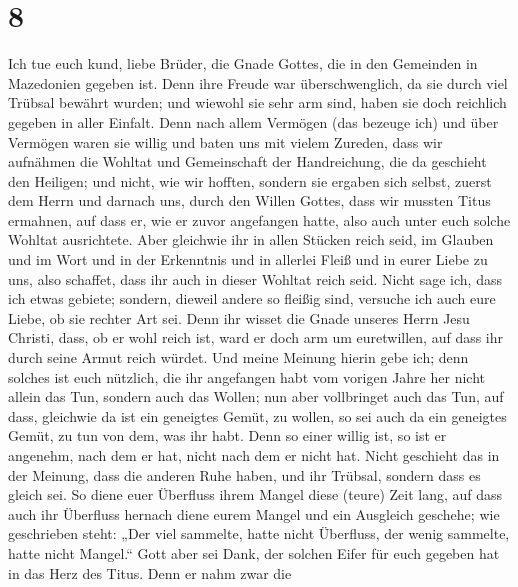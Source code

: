 \hypertarget{section-7}{%
\section{8}\label{section-7}}

 Ich tue euch kund, liebe Brüder, die Gnade Gottes, die in
den Gemeinden in Mazedonien gegeben ist.  Denn ihre Freude
war überschwenglich, da sie durch viel Trübsal bewährt wurden; und
wiewohl sie sehr arm sind, haben sie doch reichlich gegeben in aller
Einfalt.  Denn nach allem Vermögen (das bezeuge ich) und
über Vermögen waren sie willig  und baten uns mit vielem
Zureden, dass wir aufnähmen die Wohltat und Gemeinschaft der
Handreichung, die da geschieht den Heiligen;  und nicht,
wie wir hofften, sondern sie ergaben sich selbst, zuerst dem Herrn und
darnach uns, durch den Willen Gottes,  dass wir mussten
Titus ermahnen, auf dass er, wie er zuvor angefangen hatte, also auch
unter euch solche Wohltat ausrichtete.  Aber gleichwie ihr
in allen Stücken reich seid, im Glauben und im Wort und in der
Erkenntnis und in allerlei Fleiß und in eurer Liebe zu uns, also
schaffet, dass ihr auch in dieser Wohltat reich seid. 
Nicht sage ich, dass ich etwas gebiete; sondern, dieweil andere so
fleißig sind, versuche ich auch eure Liebe, ob sie rechter Art sei.
 Denn ihr wisset die Gnade unseres Herrn Jesu Christi,
dass, ob er wohl reich ist, ward er doch arm um euretwillen, auf dass
ihr durch seine Armut reich würdet.  Und meine Meinung
hierin gebe ich; denn solches ist euch nützlich, die ihr angefangen habt
vom vorigen Jahre her nicht allein das Tun, sondern auch das Wollen;
 nun aber vollbringet auch das Tun, auf dass, gleichwie
da ist ein geneigtes Gemüt, zu wollen, so sei auch da ein geneigtes
Gemüt, zu tun von dem, was ihr habt.  Denn so einer
willig ist, so ist er angenehm, nach dem er hat, nicht nach dem er nicht
hat.  Nicht geschieht das in der Meinung, dass die
anderen Ruhe haben, und ihr Trübsal, sondern dass es gleich sei.
 So diene euer Überfluss ihrem Mangel diese (teure) Zeit
lang, auf dass auch ihr Überfluss hernach diene eurem Mangel und ein
Ausgleich geschehe;  wie geschrieben steht: „Der viel
sammelte, hatte nicht Überfluss, der wenig sammelte, hatte nicht
Mangel.``  Gott aber sei Dank, der solchen Eifer für euch
gegeben hat in das Herz des Titus.  Denn er nahm zwar die
